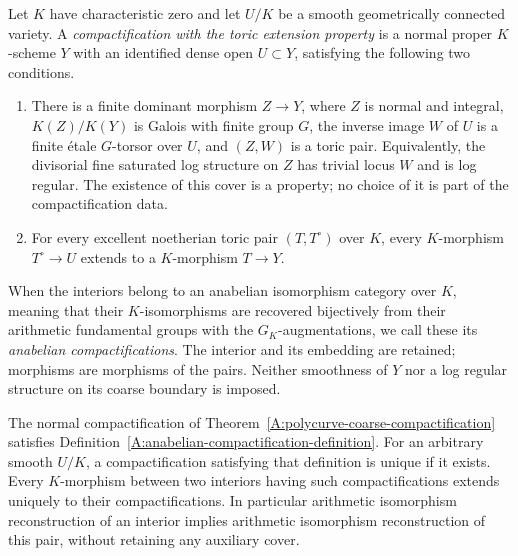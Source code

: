 \begin{definition}
\label{A:anabelian-compactification-definition}
Let $K$ have characteristic zero and let $U/K$ be a smooth
geometrically connected variety. A \emph{compactification with
the toric extension property} is a normal proper $K$-scheme $Y$
with an identified dense open $U\subset Y$, satisfying the
following two conditions.
\begin{enumerate}
\item There is a finite dominant morphism $Z\to Y$, where $Z$
is normal and integral, $K(Z)/K(Y)$ is Galois with finite group $G$, the
inverse image $W$ of $U$ is a finite \'etale $G$-torsor over
$U$, and $(Z,W)$ is a toric pair. Equivalently, the divisorial
fine saturated log structure on $Z$ has trivial locus $W$ and
is log regular. The existence of this cover is a property;
no choice of it is part of the compactification data.
\item For every excellent noetherian toric pair $(T,T^\circ)$
over $K$, every $K$-morphism $T^\circ\to U$ extends to a
$K$-morphism $T\to Y$.
\end{enumerate}
When the interiors belong to an anabelian isomorphism category
over $K$, meaning that their $K$-isomorphisms are recovered
bijectively from their arithmetic fundamental groups with the
$G_K$-augmentations, we call these its \emph{anabelian compactifications}.
The interior and its embedding are retained; morphisms are
morphisms of the pairs. Neither smoothness of $Y$ nor a log
regular structure on its coarse boundary is imposed.
\end{definition}

\begin{theorem}
\label{A:intrinsic-anabelian-compactification}
The normal compactification of
Theorem~\ref{A:polycurve-coarse-compactification} satisfies
Definition~\ref{A:anabelian-compactification-definition}.
For an arbitrary smooth $U/K$, a compactification satisfying
that definition is unique if it exists. Every $K$-morphism
between two interiors having such compactifications extends
uniquely to their compactifications. In particular arithmetic
isomorphism reconstruction of an interior implies arithmetic
isomorphism reconstruction of this pair, without retaining
any auxiliary cover.
\end{theorem}

